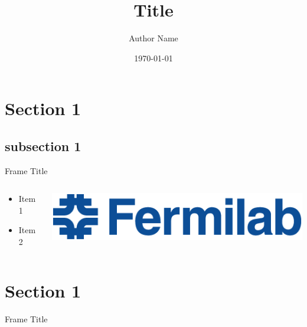\documentclass[xcolor=dvipsnames,18]{beamer}
\title[Short title]{Title}
\author[S.Name]
{Author Name}
\institute[short]{long institute}
\date{\today}
\begin{document}
\begin{frame}
\titlepage
\end{frame}
\section{Section 1}
\subsection{subsection 1}
\begin{frame}{Frame Title}
\begin{columns}
\begin{column}{0.45\textwidth}
\centering
\begin{itemize}
    \item Item 1
    \item Item 2
\end{itemize}
\end{column}
\begin{column}{0.45\textwidth}
\centering
\includegraphics[width=1\linewidth]{FNAL-Logo-NAL-Blue.png}\\
\end{column}
\end{columns}
\end{frame}
\section{Section 1}
\begin{frame}{Frame Title}
    
\end{frame}
\end{document}
